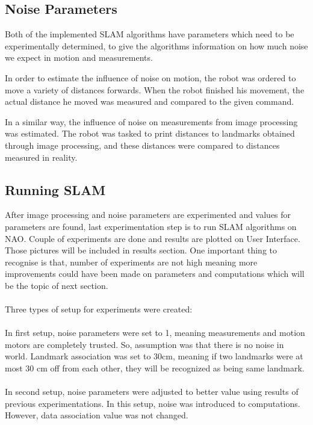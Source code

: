 \documentclass{ba-kecs}
\numberwithin{figure}{section}
\numberwithin{equation}{section}
\begin{document}
\subsection{Noise Parameters}
Both of the implemented SLAM algorithms have parameters which need to be experimentally determined, to give the algorithms information on how much noise we expect in motion and measurements.

In order to estimate the influence of noise on motion, the robot was ordered to move a variety of distances forwards. When the robot finished his movement, the actual distance he moved was measured and compared to the given command.

In a similar way, the influence of noise on measurements from image processing was estimated. The robot was tasked to print distances to landmarks obtained through image processing, and these distances were compared to distances measured in reality.

\subsection{Running SLAM}
After image processing and noise parameters are experimented and values for parameters are found, last experimentation step is to run SLAM algorithms on NAO. Couple of experiments are done and results are plotted on User Interface. Those pictures will be included in results section. One important thing to recognise is that, number of experiments are not high meaning more improvements could have been made on parameters and computations which will be the topic of next section.\\ \\

Three types of setup for experiments were created:\\ \\

In first setup, noise parameters were set to 1, meaning measurements and motion motors are completely trusted. So, assumption was that there is no noise in world. Landmark association was set to 30cm, meaning if two landmarks were at most 30 cm off from each other, they will be recognized as being same landmark.\\ \\

In second setup, noise parameters were adjusted to better value using results of previous experimentations. In this setup, noise was introduced to computations. However, data association value was not changed.\\ \\
\end{document}
